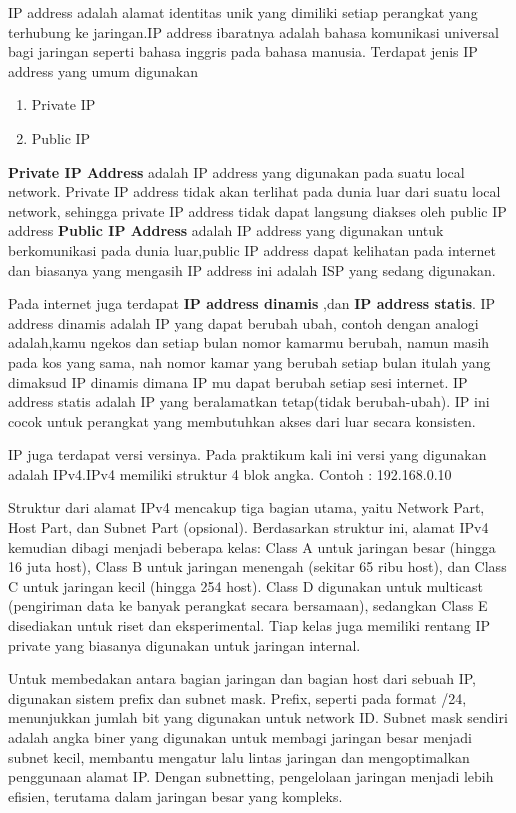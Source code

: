 IP address adalah alamat identitas unik yang dimiliki setiap perangkat yang terhubung ke jaringan.IP address 
ibaratnya adalah bahasa komunikasi universal bagi jaringan seperti bahasa inggris pada bahasa manusia.
Terdapat jenis IP address yang umum digunakan 
\begin{enumerate}
	\item Private IP
	\item Public IP
\end{enumerate}

\textbf{Private IP Address} adalah IP address yang digunakan pada suatu local network. Private IP address
tidak akan terlihat pada dunia luar dari suatu local network, sehingga private IP address tidak dapat
langsung diakses oleh public IP address
\textbf{Public IP Address} adalah IP address yang digunakan untuk berkomunikasi pada dunia luar,public 
IP address dapat kelihatan pada internet dan biasanya yang mengasih IP address ini adalah ISP yang sedang
digunakan.

Pada internet juga terdapat \textbf{IP address dinamis} ,dan \textbf{IP address statis}. IP address dinamis adalah IP yang 
dapat berubah ubah, contoh dengan analogi adalah,kamu ngekos dan setiap bulan nomor kamarmu berubah, namun
masih pada kos yang sama, nah nomor kamar yang berubah setiap bulan itulah yang dimaksud IP dinamis dimana 
IP mu dapat berubah setiap sesi internet. IP address statis adalah IP yang beralamatkan tetap(tidak berubah-ubah).
IP ini cocok untuk perangkat yang membutuhkan akses dari luar secara konsisten.

IP juga terdapat versi versinya. Pada praktikum kali ini versi yang digunakan adalah IPv4.IPv4 memiliki
struktur 4 blok angka. Contoh : 192.168.0.10

Struktur dari alamat IPv4 mencakup tiga bagian utama, yaitu Network Part, Host Part, 
dan Subnet Part (opsional). Berdasarkan struktur ini, alamat IPv4 kemudian dibagi menjadi beberapa 
kelas: Class A untuk jaringan besar (hingga 16 juta host), Class B untuk jaringan menengah 
(sekitar 65 ribu host), dan Class C untuk jaringan kecil (hingga 254 host). Class D digunakan 
untuk multicast (pengiriman data ke banyak perangkat secara bersamaan), sedangkan Class E 
disediakan untuk riset dan eksperimental. Tiap kelas juga memiliki rentang IP private 
yang biasanya digunakan untuk jaringan internal.

Untuk membedakan antara bagian jaringan dan bagian host dari sebuah IP, digunakan sistem prefix dan 
subnet mask. Prefix, seperti pada format /24, menunjukkan jumlah bit yang digunakan untuk network ID. 
Subnet mask sendiri adalah angka biner yang digunakan untuk membagi jaringan besar menjadi subnet 
kecil, membantu mengatur lalu lintas jaringan dan mengoptimalkan penggunaan alamat IP. 
Dengan subnetting, pengelolaan jaringan menjadi lebih efisien, terutama dalam jaringan besar yang 
kompleks.

